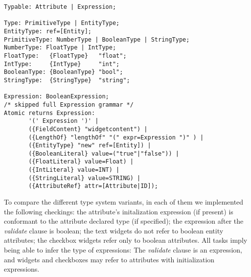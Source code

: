 \begin{lstlisting}[language=xtext,float,label=lst:grammar-plain-types-and-ex,caption=Types
and Expressions.] 
Typable: Attribute | Expression;

Type: PrimitiveType | EntityType;
EntityType: ref=[Entity];
PrimitiveType: NumberType | BooleanType | StringType;
NumberType: FloatType | IntType;
FloatType:   {FloatType}   "float";
IntType:     {IntType}     "int";
BooleanType: {BooleanType} "bool";
StringType:	 {StringType}  "string";

Expression: BooleanExpression;
/* skipped full Expression grammar */
Atomic returns Expression:
       '(' Expression ')' |
       ({FieldContent} "widgetcontent") |
       ({LengthOf} "lengthOf" "(" expr=Expression ")" ) |
       ({EntityType} "new" ref=[Entity]) | 
       ({BooleanLiteral} value=("true"|"false")) |
       ({FloatLiteral} value=Float) |
       ({IntLiteral} value=INT) |
       ({StringLiteral} value=STRING) |
       ({AttributeRef} attr=[Attribute|ID]);
\end{lstlisting}

%




To compare the different type system variants, in each of them we implemented
the following checkings: the attribute's initalization expression (if present)
is conformant to the attribute declared type (if specified); the expression
after the \emph{validate} clause is boolean; the text widgets do not refer to
boolean entity attributes; the checkbox widgets refer only to boolean
attributes.
All tasks imply being able to infer the type of expressions: The \emph{validate}
clause is an expression, and widgets and checkboxes may refer to attributes with
initialization expressions.
